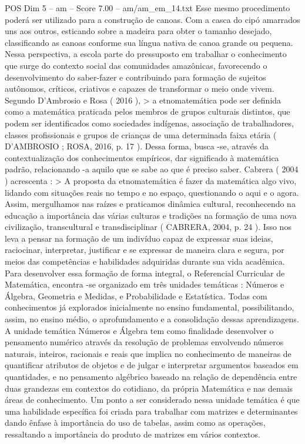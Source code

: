 \begin{textsample}{POS Dim 5 – am – Score 7.00 – am/am\_em\_14.txt}
Esse mesmo procedimento poderá ser utilizado para a construção de canoas.
Com a casca do cipó amarrados uns aos outros, esticando sobre a madeira para obter o tamanho desejado, classificando as canoas conforme sua língua nativa de canoa grande ou pequena.
Nessa perspectiva, a escola parte do pressuposto em trabalhar o conhecimento que surge do contexto social das comunidades amazônicas, favorecendo o desenvolvimento do saber-fazer e contribuindo para formação de sujeitos autônomos, críticos, criativos e capazes de transformar o meio onde vivem.
Segundo D'Ambrosio e Rosa ( 2016 ), > a etnomatemática pode ser definida como a matemática praticada pelos membros de grupos culturais distintos, que podem ser identificados como sociedades indígenas, associação de trabalhadores, classes profissionais e grupos de crianças de uma determinada faixa etária ( D'AMBROSIO ; ROSA, 2016, p. 17 ).
Dessa forma, busca -se, através da contextualização dos conhecimentos empíricos, dar significado à matemática padrão, relacionando -a aquilo que se sabe ao que é preciso saber.
Cabrera ( 2004 ) acrescenta : > A proposta da etnomatemática é fazer da matemática algo vivo, lidando com situações reais no tempo e no espaço, questionando o aqui e o agora.
Assim, mergulhamos nas raízes e praticamos dinâmica cultural, reconhecendo na educação a importância das várias culturas e tradições na formação de uma nova civilização, transcultural e transdisciplinar ( CABRERA, 2004, p. 24 ).
Isso nos leva a pensar na formação de um indivíduo capaz de expressar suas ideias, raciocinar, interpretar, justificar e se expressar de maneira clara e segura, por meios das competências e habilidades adquiridas durante sua vida acadêmica.
Para desenvolver essa formação de forma integral, o Referencial Curricular de Matemática, encontra -se organizado em três unidades temáticas : Números e Álgebra, Geometria e Medidas, e Probabilidade e Estatística.
Todas com conhecimentos já explorados inicialmente no ensino fundamental, possibilitando, assim, no ensino médio, o aprofundamento e a consolidação dessas aprendizagens.
A unidade temática Números e Álgebra tem como finalidade desenvolver o pensamento numérico através da resolução de problemas envolvendo números naturais, inteiros, racionais e reais que implica no conhecimento de maneiras de quantificar atributos de objetos e de julgar e interpretar argumentos baseados em quantidades, e no pensamento algébrico baseado na relação de dependência entre duas grandezas em contextos do cotidiano, da própria Matemática e nas demais áreas de conhecimento.
Um ponto a ser considerado nessa unidade temática é que uma habilidade específica foi criada para trabalhar com matrizes e determinantes dando ênfase à importância do uso de tabelas, assim como as operações, ressaltando a importância do produto de matrizes em vários contextos.

\end{textsample}
